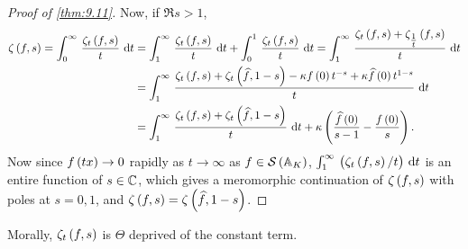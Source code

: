 \begin{proof}[Proof of \ref{thm:9.11}]
Now, if $ \Re s > 1 $,
\begin{align*}
\zeta\br{f, s}
= \intd{0}{\infty}{\dfrac{\zeta_t\br{f, s}}{t}}{t}
& = \intd{1}{\infty}{\dfrac{\zeta_t\br{f, s}}{t}}{t} + \intd{0}{1}{\dfrac{\zeta_t\br{f, s}}{t}}{t}
= \intd{1}{\infty}{\dfrac{\zeta_t\br{f, s} + \zeta_{\tfrac{1}{t}}\br{f, s}}{t}}{t} \\
& = \intd{1}{\infty}{\dfrac{\zeta_t\br{f, s} + \zeta_t\br{\widehat{f}, 1 - s} - \kappa f\br{0}t^{-s} + \kappa\widehat{f}\br{0}t^{1 - s}}{t}}{t} \\
& = \intd{1}{\infty}{\dfrac{\zeta_t\br{f, s} + \zeta_t\br{\widehat{f}, 1 - s}}{t}}{t} + \kappa\br{\dfrac{\widehat{f}\br{0}}{s - 1} - \dfrac{f\br{0}}{s}}.
\end{align*}
Now since $ f\br{tx} \to 0 $ rapidly as $ t \to \infty $ as $ f \in \SSS\br{\AA_K} $, $ \intd{1}{\infty}{\br{\zeta_t\br{f, s} / t}}{t} $ is an entire function of $ s \in \mathbb{C} $, which gives a meromorphic continuation of $ \zeta\br{f, s} $ with poles at $ s = 0, 1 $, and $ \zeta\br{f, s} = \zeta\br{\widehat{f}, 1 - s} $.
\end{proof}

Morally, $ \zeta_t\br{f, s} $ is $ \Theta $ deprived of the constant term.

